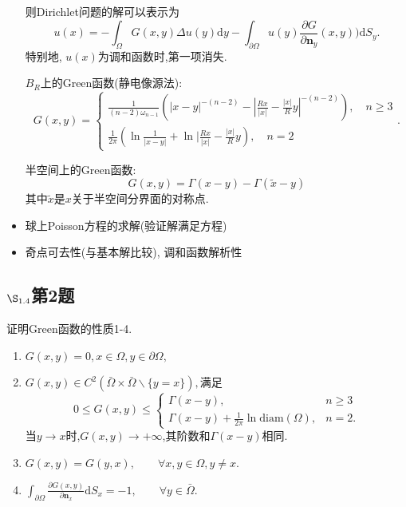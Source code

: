 \documentclass[12pt, a4paper]{ctexbook}
\newcommand{\dy}{\text{d}y}
\newcommand{\dS}{\text{d}S}
\begin{document}
\begin{itemize}
        
        则Dirichlet问题的解可以表示为
        $$u(x) = - \int_\Omega G(x, y)\Delta u(y)\dy - \int_{\partial\Omega} u(y)\frac{\partial G}{\partial\bm n_y}(x, y))\dS_y.$$
        特别地, $u(x)$为调和函数时,第一项消失.
        
        $B_R$上的Green函数(静电像源法):
        $$G(x, y) = \begin{cases}
        \frac1{(n-2)\omega_{n-1}}(|x-y|^{-(n-2)} - |\frac{Rx}{|x|}-\frac{|x|}{R}y|^{-(n-2)}), \quad n\geq 3\\
        \frac1{2\pi}(\ln\frac1{|x-y|} + \ln |\frac{Rx}{|x|} - \frac{|x|}{R}y),\quad n=2
        \end{cases}.$$
        
        半空间上的Green函数:
        $$G(x, y) = \Gamma(x-y) - \Gamma(\tilde{x}-y)$$
        其中$\tilde{x}$是$x$关于半空间分界面的对称点.
        
        \item 球上Poisson方程的求解(验证解满足方程)
        \item 奇点可去性(与基本解比较), 调和函数解析性
    \end{itemize}
    
    
    
    
    \subsection{$\S_{1.4}$第2题}
    \kaishu{}证明Green函数的性质1-4.\\
    \begin{enumerate}
        \item $G(x,y)=0,x \in \Omega,y \in \partial \Omega,
        $\item $G(x,y) \in C^2(\bar{\Omega}\times \bar{\Omega} \backslash \{y=x\}),$满足$$
        0\le G(x,y) \le \begin{cases}
        \Gamma(x-y), &n \ge 3\\
        \Gamma(x-y)+\frac{1}{2\pi}\ln \text{diam}(\Omega), &n=2.
        \end{cases}$$
        当$y \to x$时,$G(x,y) \to + \infty$,其阶数和$\Gamma(x-y)$相同.
        \item $G(x,y)=G(y,x), \qquad \forall x,y \in \Omega, y \ne x.
        $\item $\int_{\partial \Omega} \frac{\partial G(x,y)}{\partial \bm{n}_x}\dS_x =-1, \qquad \forall y \in \bar{\Omega}.$
    \end{enumerate}
    
    \quad\\
    
\end{document}
